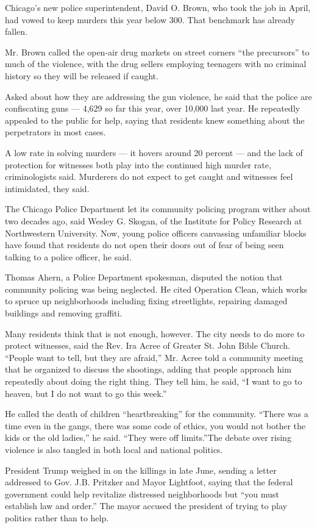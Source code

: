 Chicago's new police superintendent, David O. Brown, who took the job in
April, had vowed to keep murders this year below 300. That benchmark has
already fallen.

Mr. Brown called the open-air drug markets on street corners ``the
precursors'' to much of the violence, with the drug sellers employing
teenagers with no criminal history so they will be released if caught.

Asked about how they are addressing the gun violence, he said that the
police are confiscating guns --- 4,629 so far this year, over 10,000
last year. He repeatedly appealed to the public for help, saying that
residents knew something about the perpetrators in most cases.

A low rate in solving murders --- it hovers around 20 percent --- and
the lack of protection for witnesses both play into the continued high
murder rate, criminologists said. Murderers do not expect to get caught
and witnesses feel intimidated, they said.

The Chicago Police Department let its community policing program wither
about two decades ago, said Wesley G. Skogan, of the Institute for
Policy Research at Northwestern University. Now, young police officers
canvassing unfamiliar blocks have found that residents do not open their
doors out of fear of being seen talking to a police officer, he said.

Thomas Ahern, a Police Department spokesman, disputed the notion that
community policing was being neglected. He cited Operation Clean, which
works to spruce up neighborhoods including fixing streetlights,
repairing damaged buildings and removing graffiti.

Many residents think that is not enough, however. The city needs to do
more to protect witnesses, said the Rev. Ira Acree of Greater St. John
Bible Church. ``People want to tell, but they are afraid,'' Mr. Acree
told a community meeting that he organized to discuss the shootings,
adding that people approach him repeatedly about doing the right thing.
They tell him, he said, ``I want to go to heaven, but I do not want to
go this week.''

He called the death of children ``heartbreaking'' for the community.
``There was a time even in the gangs, there was some code of ethics, you
would not bother the kids or the old ladies,'' he said. ``They were off
limits.''The debate over rising violence is also tangled in both local
and national politics.

President Trump weighed in on the killings in late June, sending a
letter addressed to Gov. J.B. Pritzker and Mayor Lightfoot, saying that
the federal government could help revitalize distressed neighborhoods
but ``you must establish law and order.'' The mayor accused the
president of trying to play politics rather than to help.

